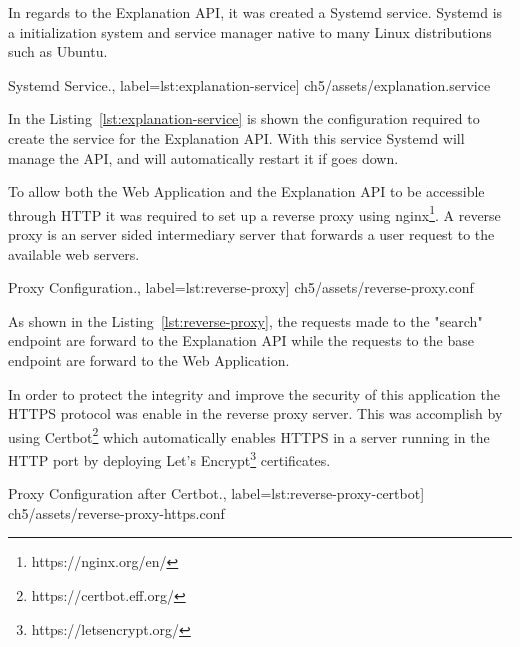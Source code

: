 In regards to the Explanation API, it was created a Systemd service.
Systemd is a initialization system and service manager native to many Linux distributions such as Ubuntu.

\begin{center}
\begin{minipage}{0.95\linewidth}
 Systemd Service.,
label=lst:explanation-service]
{ch5/assets/explanation.service}
\end{minipage}
\end{center}

In the Listing~\ref{lst:explanation-service} is shown the configuration required to create the service for the Explanation API.
With this service Systemd will manage the API, and will automatically restart it if goes down.

To allow both the Web Application and the Explanation API to be accessible through HTTP it was required to set up a reverse proxy using nginx\footnote{https://nginx.org/en/}.
A reverse proxy is an server sided intermediary server that forwards a user request to the available web servers.

\begin{center}
\begin{minipage}{0.95\linewidth}
 Proxy Configuration.,
label=lst:reverse-proxy]
{ch5/assets/reverse-proxy.conf}
\end{minipage}
\end{center}

As shown in the Listing~\ref{lst:reverse-proxy}, the requests made to the "search" endpoint are forward to the Explanation API while the requests to the base endpoint are forward to the Web Application.

In order to protect the integrity and improve the security of this application the HTTPS protocol was enable in the reverse proxy server.
This was accomplish by using Certbot\footnote{https://certbot.eff.org/} which automatically enables HTTPS in a server running in the HTTP port by deploying Let's Encrypt\footnote{https://letsencrypt.org/} certificates.

\begin{center}
\begin{minipage}{0.95\linewidth}
 Proxy Configuration after Certbot.,
label=lst:reverse-proxy-certbot]
{ch5/assets/reverse-proxy-https.conf}
\end{minipage}
\end{center}

